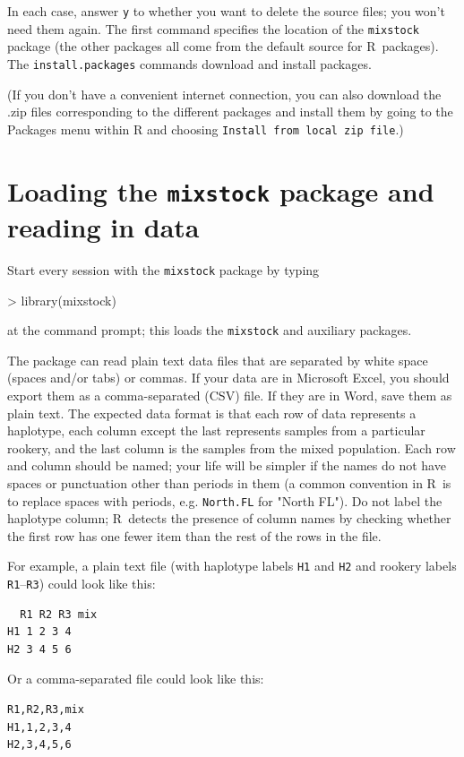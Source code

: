 \documentclass[11pt]{article}
\newcommand{\R}{{\sf R}}
\begin{document}
In each case, answer {\tt y} to whether you want to delete
the source files; you won't need them again.
The first command specifies the location of the
{\tt mixstock} package
(the other packages all come from the default source for \R\ packages).
The {\tt install.packages} commands download and
install packages.

(If you don't have a convenient internet connection,
you can also download the .zip files corresponding
to the different packages and install them by going
to the Packages menu within R and choosing
{\tt Install from local zip file}.)

\section{Loading the {\tt mixstock} package and reading  in data}
Start every session with the {\tt mixstock} package by
typing 
\begin{Schunk}
\begin{Sinput}
> library(mixstock)
\end{Sinput}
\end{Schunk}
at the command prompt;
this loads the {\tt mixstock} and auxiliary packages.

The package can read plain text data files that are separated by white
space (spaces and/or tabs) or commas.  If your data are in Microsoft
Excel, you should export them as a comma-separated (CSV) file.  If
they are in Word, save them as plain text.  The expected data format
is that each row of data represents a haplotype, each column except
the last represents samples from a particular rookery, and the last
column is the samples from the mixed population.  Each row and column
should be named; your life will be simpler if the names do not have
spaces or punctuation other than periods in them (a common convention
in \R\ is to replace spaces with periods, e.g. {\tt North.FL} for
"North FL").  Do not label the haplotype column; \R\ detects the
presence of column names by checking whether the first row has one
fewer item than the rest of the rows in the file.

For example, a plain text file (with
haplotype labels {\tt H1} and {\tt H2}
and rookery labels {\tt R1}--{\tt R3})
could look like this:
\begin{verbatim}
  R1 R2 R3 mix
H1 1 2 3 4
H2 3 4 5 6
\end{verbatim}
Or a comma-separated file could look like this:
\begin{verbatim}
R1,R2,R3,mix
H1,1,2,3,4
H2,3,4,5,6
\end{verbatim}
\end{document}
